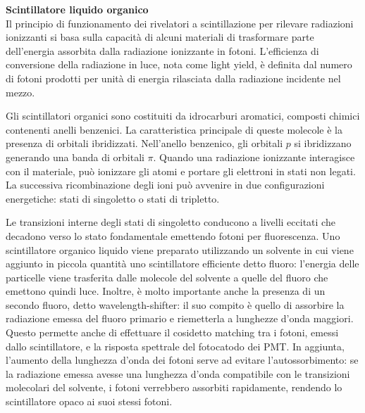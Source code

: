 \textbf{Scintillatore liquido organico}\\%
Il principio di funzionamento dei rivelatori a scintillazione per rilevare radiazioni ionizzanti si basa sulla capacità di alcuni materiali di trasformare parte dell'energia assorbita dalla radiazione ionizzante in fotoni. L'efficienza di conversione della radiazione in luce, nota come light yield, è definita dal numero di fotoni prodotti per unità di energia rilasciata dalla radiazione incidente nel mezzo.

Gli scintillatori organici sono costituiti da idrocarburi aromatici, composti chimici contenenti anelli benzenici. La caratteristica principale di queste molecole è la presenza di orbitali ibridizzati. Nell'anello benzenico, gli orbitali $p$ si ibridizzano generando una banda di orbitali $\pi$. Quando una radiazione ionizzante interagisce con il materiale, può ionizzare gli atomi e portare gli elettroni in stati non legati. La successiva ricombinazione degli ioni può avvenire in due configurazioni energetiche: stati di singoletto o stati di tripletto.

Le transizioni interne degli stati di singoletto conducono a livelli eccitati che decadono verso lo stato fondamentale emettendo fotoni per fluorescenza. Uno scintillatore organico liquido viene preparato utilizzando un solvente in cui viene aggiunto in piccola quantità uno scintillatore efficiente detto fluoro: l'energia delle particelle viene trasferita dalle molecole del solvente a quelle del fluoro che emettono quindi luce. Inoltre, è molto importante anche la presenza di un secondo fluoro, detto wavelength-shifter: il suo compito è quello di assorbire la radiazione emessa del fluoro primario e riemetterla a lunghezze d'onda maggiori. Questo permette anche di effettuare il cosidetto matching tra i fotoni, emessi dallo scintillatore, e la risposta spettrale del fotocatodo dei PMT. In aggiunta, l'aumento della lunghezza d'onda dei fotoni serve ad evitare l'autossorbimento: se la radiazione emessa avesse una lunghezza d'onda compatibile con le transizioni molecolari del solvente, i fotoni verrebbero assorbiti rapidamente, rendendo lo scintillatore opaco ai suoi stessi fotoni.

